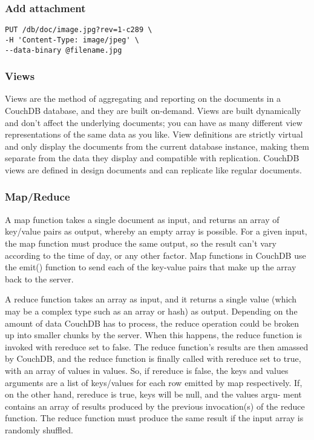 \subsubsection{Add attachment}
\begin{lstlisting}
PUT /db/doc/image.jpg?rev=1-c289 \
-H 'Content-Type: image/jpeg' \
--data-binary @filename.jpg
\end{lstlisting}

\subsubsection{Views}

Views are the method of aggregating and reporting on the documents in a CouchDB database, and they are built on-demand. Views are built dynamically and don’t affect the underlying documents; you can have as many different view representations of the same data as you like. View definitions are strictly virtual and only display the documents from the current database instance, making them separate from the data they display and compatible with replication. CouchDB views are defined in design documents and can replicate like regular documents.

\subsubsection{Map/Reduce}

A map function takes a single document as input, and returns an array of key/value pairs as output, whereby an empty array is possible. For a given input, the map function must produce the same output, so the result can’t vary according to the time of day, or any other factor. Map functions in CouchDB use the emit() function to send each of the key-value pairs that make up the array back to the server.

A reduce function takes an array as input, and it returns a single value (which may be a complex type such as an array or hash) as output. Depending on the amount of data CouchDB has to process, the reduce operation could be broken up into smaller chunks by the server. When this happens, the reduce function is invoked with rereduce set to false. The reduce function’s results are then amassed by CouchDB, and the reduce function is finally called with rereduce set to true, with an array of values in values. So, if rereduce is false, the keys and values arguments are a list of keys/values for each row emitted by map respectively. If, on the other hand, rereduce is true, keys will be null, and the values argu- ment contains an array of results produced by the previous invocation(s) of the reduce function. The reduce function must produce the same result if the input array is randomly shuffled.

